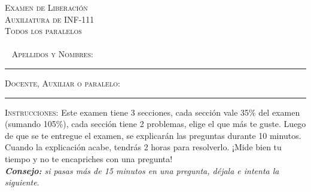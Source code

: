 \documentclass{article}
\begin{document}
\begin{center}
  \textsc{Examen de Liberación} \\
  \textsc{Auxiliatura de INF-111} \\
  \textsc{Todos los paralelos} \\~ \\~
  \textsc{Apellidos y Nombres:} \rule{6cm}{.1pt} \hfill
  \textsc{Docente, Auxiliar o paralelo: } \rule{3cm}{.1pt}

  \hrulefill
\end{center}
\textsc{Instrucciones:} Este examen tiene 3 secciones, cada sección vale 35\% del examen (sumando 105\%), cada sección tiene 2 problemas, elige el que más te guste. Luego de que se te entregue el examen, se explicarán las preguntas durante 10 minutos. Cuando la explicación acabe, tendrás 2 horas para resolverlo. ¡Mide bien tu tiempo y no te encapriches con una pregunta! \\
\textit{\textbf{Consejo:} si pasas más de 15 minutos en una pregunta, déjala e intenta la siguiente}.

\hrulefill
\end{document}
